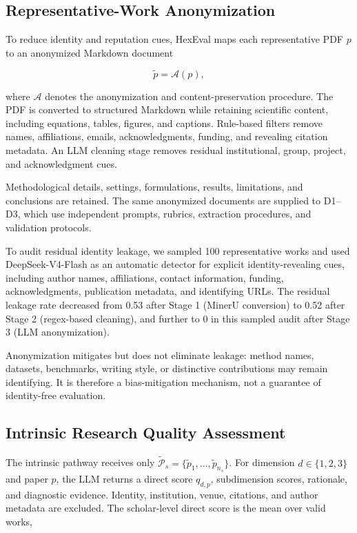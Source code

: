 \documentclass[letterpaper]{article} %
\begin{document}
\subsection{Representative-Work Anonymization}

To reduce identity and reputation cues, HexEval maps each representative PDF $p$ to an anonymized Markdown document

\begin{equation}
\widetilde{p}=\mathcal{A}(p),
\end{equation}

where $\mathcal{A}$ denotes the anonymization and content-preservation procedure.
The PDF is converted to structured Markdown while retaining scientific content, including equations, tables,
figures, and captions. Rule-based filters remove names, affiliations, emails, acknowledgments, funding, and 
revealing citation metadata. An LLM cleaning stage removes residual institutional, group, project, and 
acknowledgment cues.

Methodological details, settings, formulations, results, limitations, and conclusions are retained. The same anonymized documents are supplied to D1--D3, which use independent prompts, rubrics, extraction procedures, and 
validation protocols.

To audit residual identity leakage, we sampled 100 representative works and used DeepSeek-V4-Flash as an 
automatic detector for explicit identity-revealing cues, including author names, affiliations, contact 
information, funding, acknowledgments, publication metadata, and identifying URLs. The residual leakage rate 
decreased from 0.53 after Stage 1 (MinerU conversion) to 0.52 after Stage 2 (regex-based cleaning), and further 
to 0 in this sampled audit after Stage 3 (LLM anonymization).

Anonymization mitigates but does not eliminate leakage: method names, datasets, benchmarks, writing style, or 
distinctive contributions may remain identifying. It is therefore a bias-mitigation mechanism, not a guarantee 
of identity-free evaluation.

\subsection{Intrinsic Research Quality Assessment}
\label{sec:intrinsic}

The intrinsic pathway receives only $\widetilde{\mathcal{P}}_s=\{\widetilde{p}_1,\ldots,\widetilde{p}_{n_s}\}$. For dimension $d\in\{1,2,3\}$ and paper $p$, the LLM returns a direct score $q_{d,p}$, subdimension scores, rationale, and diagnostic evidence. Identity, institution, venue, citations, and author metadata are excluded. The scholar-level direct score is the mean over valid works,
\end{document}
